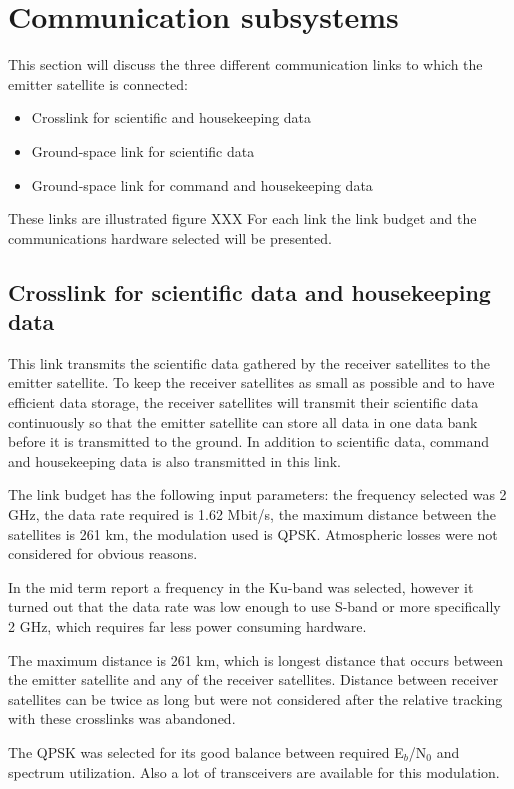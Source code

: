 
\section{Communication subsystems}
This section will discuss the  three different communication links to which the emitter satellite is connected:
\begin{itemize}
\item Crosslink for scientific and housekeeping data
\item Ground-space link for scientific data
\item Ground-space link for command and housekeeping data
\end{itemize}

These links are illustrated figure XXX
For each link the link budget and the communications hardware selected will be presented.

\subsection{Crosslink for scientific data and housekeeping data}
\label{Crossem}
This link transmits the scientific data gathered by the receiver satellites to the emitter satellite. To keep the receiver satellites as small as possible and to have efficient data storage, the receiver satellites will transmit their scientific data continuously so that the emitter satellite can store all data in one data bank before it is transmitted to the ground. In addition to scientific data, command and housekeeping data is also transmitted in this link.

The link budget has the following input parameters: the frequency selected was 2 GHz, the data rate required is 1.62 Mbit/s, the maximum distance between the satellites is 261 km, the modulation used is QPSK. Atmospheric losses were not considered for obvious reasons.

In the mid term report a frequency in the Ku-band was selected, however it turned out that the data rate was low enough to use S-band or more specifically 2 GHz, which requires far less power consuming hardware.

The maximum distance is 261 km, which is longest distance that occurs between the emitter satellite and any of the receiver satellites. Distance between receiver satellites can be twice as long but were not considered after the relative tracking with these crosslinks was abandoned.

The QPSK was selected for its good balance between required E$_{b}$/N$_{0}$ and spectrum utilization. Also a lot of transceivers are available for this modulation.

